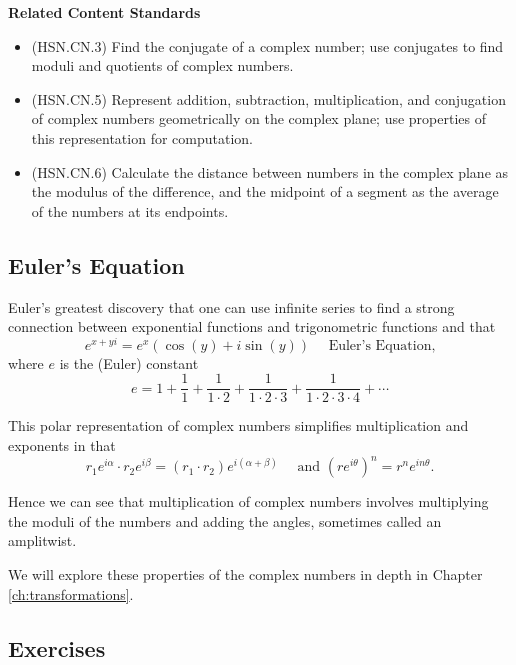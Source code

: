 \documentclass[
]{book}
\providecommand{\tightlist}{%
  \setlength{\itemsep}{0pt}\setlength{\parskip}{0pt}}
\newenvironment{standards}{}{}
\theoremstyle{definition}
\theoremstyle{definition}
\theoremstyle{definition}
\theoremstyle{definition}
\theoremstyle{remark}
\begin{document}
\begin{standards}

\begin{center}
\textbf{Related Content Standards}

\end{center}

\begin{itemize}
\tightlist
\item
  (HSN.CN.3) Find the conjugate of a complex number; use conjugates to find moduli and quotients of complex numbers.
\item
  (HSN.CN.5) Represent addition, subtraction, multiplication, and conjugation of complex numbers geometrically on the complex plane; use properties of this representation for computation.
\item
  (HSN.CN.6) Calculate the distance between numbers in the complex plane as the modulus of the difference, and the midpoint of a segment as the average of the numbers at its endpoints.
\end{itemize}

\end{standards}

\hypertarget{eulers-equation}{%
\subsection{Euler's Equation}\label{eulers-equation}}

Euler's \citeyearpar{Euler} greatest discovery that one can use infinite series to find a strong connection between exponential functions and trigonometric functions and that
\[e^{x+yi} = e^x \left( \cos(y) + i \sin(y)\right) \quad \mbox{ Euler's Equation,}\] where \(e\) is the (Euler) constant \[e= 1 + \frac{1}{1} + \frac{1}{1\cdot 2} + \frac{1}{1\cdot 2 \cdot 3} + \frac{1}{1\cdot 2\cdot 3\cdot 4} + \cdots\]

This polar representation of complex numbers simplifies multiplication and exponents in that
\[r_1 e^{i\alpha} \cdot r_2 e^{i\beta} = (r_1\cdot r_2) e^{i(\alpha+\beta)} \quad \mbox{ and } \left(r e^{i\theta}\right)^n = r^n e^{in\theta}.\]

Hence we can see that multiplication of complex numbers involves multiplying the moduli of the numbers and adding the angles, sometimes called an amplitwist.

We will explore these properties of the complex numbers in depth in Chapter \ref{ch:transformations}.

\hypertarget{exercises-15}{%
\subsection{Exercises}\label{exercises-15}}
\end{document}
